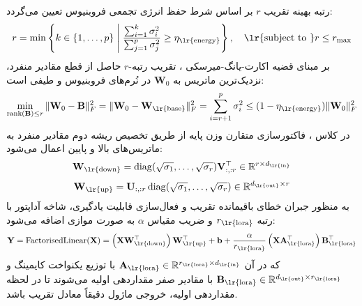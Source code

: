 رتبه بهینه تقریب $r$ بر اساس شرط حفظ انرژی تجمعی فروبنیوس تعیین می‌گردد:
\begin{equation}
r = \min \left\{ k \in \{1, \dots, p\} \;\middle|\; \frac{\sum_{i=1}^k \sigma_i^2}{\sum_{j=1}^p \sigma_j^2} \ge \eta_{\text{\lr{energy}}} \right\}, \quad \text{\lr{subject to }} r \le r_{\max}
\end{equation}
بر مبنای قضیه اکارت-یانگ-میرسکی ، تقریب رتبه-$r$ حاصل از قطع مقادیر منفرد، نزدیک‌ترین ماتریس به $\mathbf{W}_0$ در نُرم‌های فروبنیوس و طیفی است:
\begin{equation}
\min_{\operatorname{rank}(\mathbf{B}) \le r} \|\mathbf{W}_0 - \mathbf{B}\|_F^2 = \|\mathbf{W}_0 - \mathbf{W}_{\text{\lr{base}}}\|_F^2 = \sum_{i=r+1}^p \sigma_i^2 \le (1 - \eta_{\text{\lr{energy}}}) \|\mathbf{W}_0\|_F^2
\end{equation}
در کلاس ، فاکتورسازی متقارن وزن پایه از طریق تخصیص ریشه دوم مقادیر منفرد به ماتریس‌های بالا و پایین اعمال می‌شود:
\begin{equation}
\mathbf{W}_{\text{\lr{down}}} = \operatorname{diag}(\sqrt{\sigma_1}, \dots, \sqrt{\sigma_r}) \mathbf{V}_{:, :r}^\top \in \mathbb{R}^{r \times d_{\text{\lr{in}}}}
\end{equation}
\begin{equation}
\mathbf{W}_{\text{\lr{up}}} = \mathbf{U}_{:, :r} \operatorname{diag}(\sqrt{\sigma_1}, \dots, \sqrt{\sigma_r}) \in \mathbb{R}^{d_{\text{\lr{out}}} \times r}
\end{equation}
به منظور جبران خطای باقیمانده تقریب و فعال‌سازی قابلیت یادگیری، شاخه آداپتور  با رتبه $r_{\text{\lr{lora}}}$ و ضریب مقیاس $\alpha$ به صورت موازی اضافه می‌شود:
\begin{equation}
\mathbf{Y} = \operatorname{FactorisedLinear}(\mathbf{X}) = \left( \mathbf{X} \mathbf{W}_{\text{\lr{down}}}^\top \right) \mathbf{W}_{\text{\lr{up}}}^\top + \mathbf{b} + \frac{\alpha}{r_{\text{\lr{lora}}}} \left( \mathbf{X} \mathbf{A}_{\text{\lr{lora}}}^\top \right) \mathbf{B}_{\text{\lr{lora}}}^\top
\end{equation}
که در آن $\mathbf{A}_{\text{\lr{lora}}} \in \mathbb{R}^{r_{\text{\lr{lora}}} \times d_{\text{\lr{in}}}}$ با توزیع یکنواخت کایمینگ و $\mathbf{B}_{\text{\lr{lora}}} \in \mathbb{R}^{d_{\text{\lr{out}}} \times r_{\text{\lr{lora}}}}$ با مقادیر صفر مقداردهی اولیه می‌شوند تا در لحظه مقداردهی اولیه، خروجی ماژول دقیقاً معادل تقریب  باشد.

